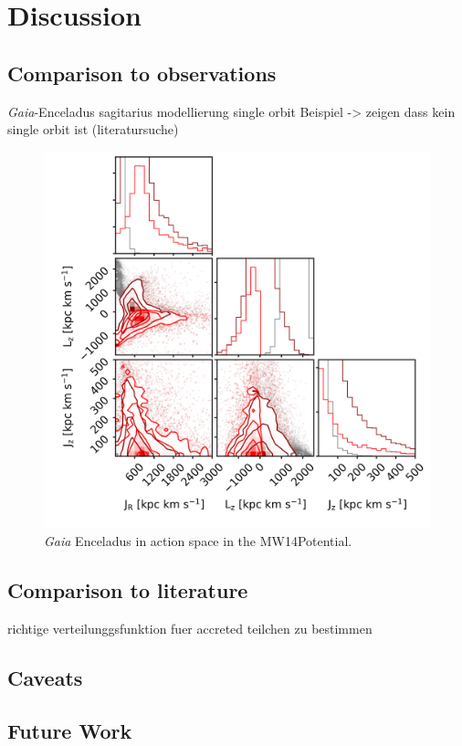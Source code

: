 \section{Discussion} \label{sec:Discussion}
\subsection{Comparison to observations}
\textit{Gaia}-Enceladus \cite{Enceladus....Helmi...2018}
sagitarius modellierung single orbit Beispiel
-> zeigen dass kein single orbit ist (literatursuche)

\begin{figure}[htbp]
    \centering
    \includegraphics[width=1.0\textwidth]{plots/Discussion/Gaia_all_actions_MW14_talk3.png}
    \caption{\textit{Gaia} Enceladus in action space in the MW14Potential.}
    \label{fig:act_both_merg_best_pot}
\end{figure}

\subsection{Comparison to literature}
richtige verteilunggsfunktion fuer accreted teilchen zu bestimmen 

\subsection{Caveats}

\subsection{Future Work}